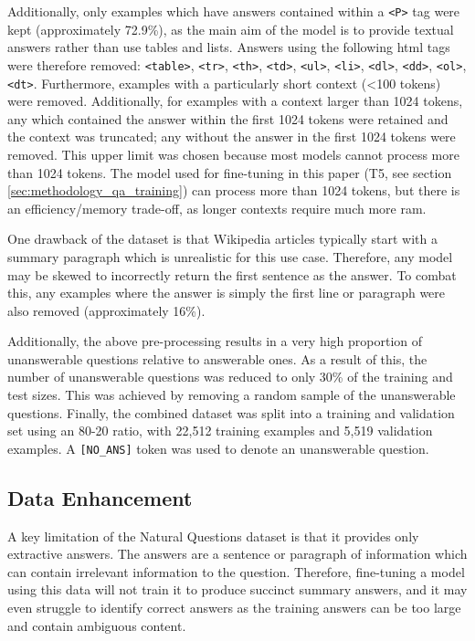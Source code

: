 Additionally, only examples which have answers contained within a \texttt{<P>} tag were kept (approximately 72.9\%), as the main aim of the model is to provide textual answers rather than use tables and lists. Answers using the following \acrshort{html} tags were therefore removed: \texttt{<table>}, \texttt{<tr>}, \texttt{<th>}, \texttt{<td>}, \texttt{<ul>}, \texttt{<li>}, \texttt{<dl>}, \texttt{<dd>}, \texttt{<ol>}, \texttt{<dt>}. Furthermore, examples with a particularly short context (<100 tokens) were removed. Additionally, for examples with a context larger than 1024 tokens, any which contained the answer within the first 1024 tokens were retained and the context was truncated; any without the answer in the first 1024 tokens were removed. This upper limit was chosen because most models cannot process more than 1024 tokens. The model used for fine-tuning in this paper (T5, see section \ref{sec:methodology_qa_training}) can process more than 1024 tokens, but there is an efficiency/memory trade-off, as longer contexts require much more \acrshort{ram}.

One drawback of the dataset is that Wikipedia articles typically start with a summary paragraph which is unrealistic for this use case. Therefore, any model may be skewed to incorrectly return the first sentence as the answer. To combat this, any examples where the answer is simply the first line or paragraph were also removed (approximately 16\%).

Additionally, the above pre-processing results in a very high proportion of unanswerable questions relative to answerable ones. As a result of this, the number of unanswerable questions was reduced to only 30\% of the training and test sizes. This was achieved by removing a random sample of the unanswerable questions. Finally, the combined dataset was split into a training and validation set using an 80-20 ratio, with 22,512 training examples and 5,519 validation examples. A \texttt{[NO\_ANS]} token was used to denote an unanswerable question.

\subsection{Data Enhancement}\label{sec:methodology_data_enhancement}
A key limitation of the Natural Questions dataset is that it provides only extractive answers. The answers are a sentence or paragraph of information which can contain irrelevant information to the question. Therefore, fine-tuning a model using this data will not train it to produce succinct summary answers, and it may even struggle to identify correct answers as the training answers can be too large and contain ambiguous content.

